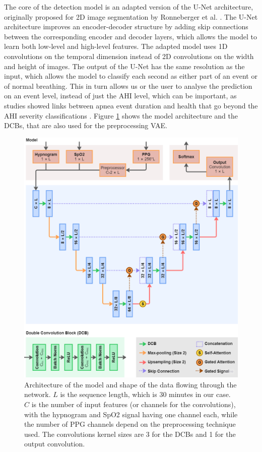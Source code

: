 The core of the detection model is an adapted version of the U-Net architecture, originally proposed for 2D image segmentation by Ronneberger et al. \cite{ronneberger2015u}. The U-Net architecture improves an encoder-decoder structure by adding skip connections between the corresponding encoder and decoder layers, which allows the model to learn both low-level and high-level features. The adapted model uses 1D convolutions on the temporal dimension instead of 2D convolutions on the width and height of images. The output of the U-Net has the same resolution as the input, which allows the model to classify each second as either part of an event or of normal breathing. This in turn allows us or the user to analyse the prediction on an event level, instead of just the AHI level, which can be important, as studies showed links between apnea event duration and health that go beyond the AHI severity classifications \cite{butler2019apnea}. Figure \ref{fig:model} shows the model architecture and the DCBs, that are also used for the preprocessing VAE.

\begin{figure}
    \centering
    \includegraphics[width=\textwidth]{images/Model}
    \caption{Architecture of the model and shape of the data flowing through the network. $L$ is the sequence length, which is 30 minutes in our case. $C$ is the number of input features (or channels for the convolutions), with the hypnogram and SpO2 signal having one channel each, while the number of PPG channels depend on the preprocessing technique used. The convolutions kernel sizes are 3 for the DCBs and 1 for the output convolution.}
    \label{fig:model}
\end{figure}

